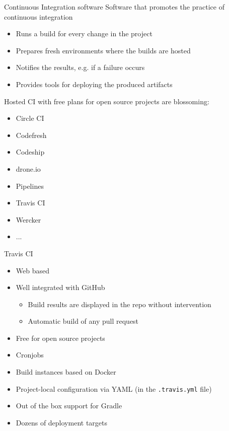 \documentclass[presentation]{beamer}
\begin{document}
\begin{frame}[fragile]{Continuous Integration software}
	Software that promotes the practice of continuous integration
	\begin{itemize}
		\item Runs a build for every change in the project
		\item Prepares fresh environments where the builds are hosted
		\item Notifies the results, e.g. if a failure occurs
		\item Provides tools for deploying the produced artifacts
	\end{itemize}
	Hosted CI with free plans for open source projects are blossoming:
	\scriptsize
	\begin{itemize}
		\item Circle CI
		\item Codefresh
		\item Codeship
		\item drone.io
		\item Pipelines
		\item Travis CI
		\item Wercker
		\item ...
	\end{itemize}
\end{frame}

\begin{frame}[fragile]{Travis CI}
	\begin{itemize}
		\item Web based
		\item Well integrated with GitHub
		\begin{itemize}
			\item Build results are displayed in the repo without intervention
			\item Automatic build of any pull request
		\end{itemize}
		\item Free for open source projects
		\item Cronjobs
		\item Build instances based on Docker
		\item Project-local configuration via YAML (in the \texttt{.travis.yml} file)
		\item Out of the box support for Gradle
		\item Dozens of deployment targets
	\end{itemize}
\end{frame}
\end{document}
